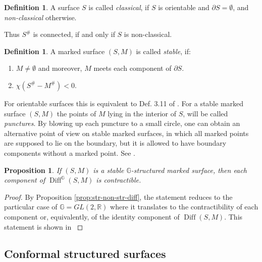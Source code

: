 \documentclass[english,11pt,leqno]{article}
\def\GG{\mathbb{G}}
\def\RR{\mathbb{R}}
\def\on{\operatorname}
\def\Diff{\on{Diff}}
\newtheorem{prop}[thm]{Proposition}
\theoremstyle{definition}
\newtheorem{defi}[thm]{Definition}
\theoremstyle{remark}
\numberwithin{equation}{section}
\begin{document}
\begin{defi} \cite{seppala} A surface $S$ is called {\em classical}, if $S$ is orientable and $\partial S=\emptyset$,
and {\em non-classical} otherwise. 
\end{defi}

Thus $S^\#$ is connected, if and only if $S$ is non-classical. 

\begin{defi} A marked surface $(S,M)$ is called {\em stable}, if:
\begin{enumerate}
\item[(1)]  $M\neq\emptyset$ and moreover, $M$ meets each component of $\partial S$.

\item[(2)] $\chi (S^\# - M^\#) < 0$. 
\end{enumerate}

\end{defi}

For orientable surfaces this is equivalent to Def. 3.11 of \cite {HSS-triangulated}. 
For a stable marked surface $(S,M)$ the points of $M$ lying in the interior of $S$, will be called
{\em punctures}. By blowing up each puncture to a small circle, one can obtain an alternative
point of view on stable marked surfaces, in which all marked points are supposed to lie on
the boundary, but it is allowed to have boundary components without a marked point.
See \cite[Rem. 3.3.2]{HSS-triangulated}. 
     
\begin{prop}\label{prop:diff-contract}
If $(S,M)$ is a stable $\GG$-structured marked surface, then each component of
$\Diff^\GG(S,M)$ is contractible.
\end{prop}
     
\begin{proof} By Proposition \ref{prop:str-non-str-diff}, the statement reduces to
the particular case of $\GG=GL(2,\RR)$ where it translates to the contractibility of each component
or, equivalently, of the identity component of $\Diff(S,M)$. This statement is shown in
\cite{gramain} 
\end{proof}
     
     






\subsection{Conformal structured surfaces}
\end{document}

